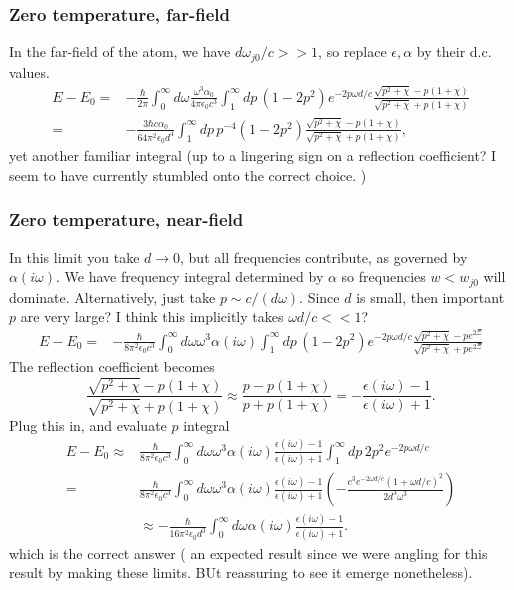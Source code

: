 \subsubsection{Zero temperature, far-field}
In the far-field of the atom, we have $d\omega_{j0}/c>>1$, so replace $\epsilon,\alpha$ by their d.c. values.  
\begin{align}
E-E_0=& -\frac{\hbar}{2\pi}\int_0^\infty d\omega \frac{\omega^3\alpha_0}{4\pi\epsilon_0c^3}
\int_1^\infty dp\,\left(1-2p^2\right)e^{-2p\omega d/c}\frac{\sqrt{p^2+\chi}-p(1+\chi)}{\sqrt{p^2+\chi}+p(1+\chi)}\\
=& -\frac{3\hbar c\alpha_0}{64\pi^2\epsilon_0d^4}\int_1^\infty dp\,p^{-4}
\left(1-2p^2\right)\frac{\sqrt{p^2+\chi}-p(1+\chi)}{\sqrt{p^2+\chi}+p(1+\chi)},
\end{align}
yet another familiar integral (up to a lingering sign on a reflection coefficient?
 I seem to have currently stumbled onto the correct choice. )  

\subsubsection{Zero temperature, near-field}

In this limit you take $d\rightarrow 0$, but all frequencies contribute, as governed by $\alpha(i\omega)$.
    We have frequency integral determined by $\alpha$ so frequencies $w < w_{j0}$ will dominate.
  Alternatively, just take $p\sim c/(d\omega)$.
  Since $d$ is small, then important $p$ are very large?
  I think this implicitly takes $\omega d/c<<1$?
\begin{align}
E-E_0=& -\frac{\hbar}{8\pi^2\epsilon_0c^3}\int_0^\infty d\omega \omega^3\alpha(i\omega)\int_1^\infty dp\,
\left(1-2p^2\right)e^{-2p\omega d/c}\frac{\sqrt{p^2+\chi}-pe^{2\Xi}}{\sqrt{p^2+\chi}+p e^{2\Xi}} 
\end{align}
The reflection coefficient becomes
\begin{equation}
\frac{\sqrt{p^2+\chi}-p(1+\chi)}{\sqrt{p^2+\chi}+p(1+\chi)} \approx \frac{ p-p(1+\chi)}{p+p(1+\chi)} =
 -\frac{\epsilon(i\omega)-1}{\epsilon(i\omega)+1}.
\end{equation}
Plug this in, and evaluate $p$ integral
\begin{align}
E-E_0\approx& \frac{\hbar}{8\pi^2\epsilon_0c^3}\int_0^\infty d\omega \omega^3
\alpha(i\omega)\frac{\epsilon(i\omega)-1}{\epsilon(i\omega)+1}\int_1^\infty dp\,2p^2e^{-2p\omega d/c}\\
=& \frac{\hbar}{8\pi^2\epsilon_0c^3}\int_0^\infty d\omega \omega^3
\alpha(i\omega)\frac{\epsilon(i\omega)-1}{\epsilon(i\omega)+1}\left(-\frac{c^3e^{-2\omega d/c}(1+\omega d/c)^2}{2 d^3\omega^3}\right)\\
&\approx -\frac{\hbar }{16\pi^2\epsilon_0 d^3}\int_0^\infty d\omega 
\alpha(i\omega)\frac{\epsilon(i\omega)-1}{\epsilon(i\omega)+1}.
\end{align}
which is the correct answer ( an expected result since we were angling for this result by making these limits.
  BUt reassuring to see it emerge nonetheless).  

